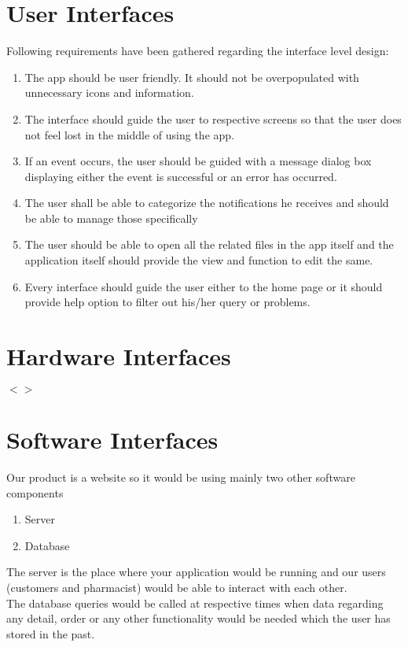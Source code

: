 \documentclass{scrreprt}
\begin{document}
\section{User Interfaces}
Following requirements have been gathered regarding the interface level design:
\begin{enumerate}
 \item The app should be user friendly. It should not be overpopulated with unnecessary icons and information. 
 \item The interface should guide the user to respective screens so that the user does not feel lost in the middle of using the app.
 \item If an event occurs, the user should be guided with a message dialog box displaying either the event is successful or an error has 
       occurred.    
 \item The user shall be able to categorize the notifications he receives and should be able to manage those specifically
 \item The user should be able to open all the related files in the app itself and the application itself should provide the view and    function to edit the same.
 \item Every interface should guide the user either to the home page or it should provide help option to filter out his/her query or problems. 
\end{enumerate}


\section{Hardware Interfaces}
$<$$>$


\section{Software Interfaces}
Our product is a website so it would be using mainly two other software components 

\begin{enumerate}
\item Server
\item Database
\end{enumerate}
The server is the place where your application would be running and our users (customers and pharmacist) would be able to interact with each other.  \\
The database queries would be called at respective times when data regarding any detail, order or any other functionality would be needed which the user has stored in the past.
\end{document}
